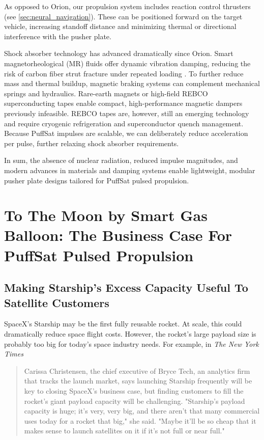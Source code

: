 \documentclass{article}
\begin{document}
{As opposed to Orion, our propulsion system includes reaction control thrusters (see \autoref{sec:neural_navigation}). These can be positioned forward on the target vehicle, increasing standoff distance and minimizing thermal or directional interference with the pusher plate. 

Shock absorber technology has advanced dramatically since Orion. Smart magnetorheological (MR) fluids offer dynamic vibration damping, reducing the risk of carbon fiber strut fracture under repeated loading \cite{mr_fluids}. To further reduce mass and thermal buildup, magnetic braking systems can complement mechanical springs and hydraulics. Rare-earth magnets \cite{rare_earth_braking} or high-field REBCO superconducting tapes \cite{rebco_tapes} enable compact, high-performance magnetic dampers previously infeasible. REBCO tapes are, however, still an emerging technology and require cryogenic refrigeration and superconductor quench management.  Because PuffSat impulses are scalable, we can deliberately reduce acceleration per pulse, further relaxing shock absorber requirements.

In sum, the absence of nuclear radiation, reduced impulse magnitudes, and modern advances in materials and damping systems enable lightweight, modular pusher plate designs tailored for PuffSat pulsed propulsion.

\section{To The Moon by Smart Gas Balloon:  The Business Case For PuffSat Pulsed Propulsion}   

\subsection{Making Starship's Excess Capacity Useful To Satellite Customers} \label{sec:starship_safelaunch}

SpaceX's Starship may be the first fully reusable rocket. At scale, this could dramatically reduce space flight costs.   However, the rocket's large payload size is probably too big for today's space industry needs. For example, in \textit{The New York Times}

\begin{quote}
Carissa Christensen, the chief executive of Bryce Tech, an analytics firm that tracks the launch market, says launching Starship frequently will be key to closing SpaceX’s business case, but finding customers to fill the rocket’s giant payload capacity will be challenging. 
"Starship's payload capacity is huge; it's very, very big, and there aren't that many commercial uses today for a rocket that big," she said.  "Maybe it'll be so cheap that it makes sense to launch satellites on it if it's not full or near full."  \cite{nyt_starship_size}
\end{quote}

}
\end{document}
